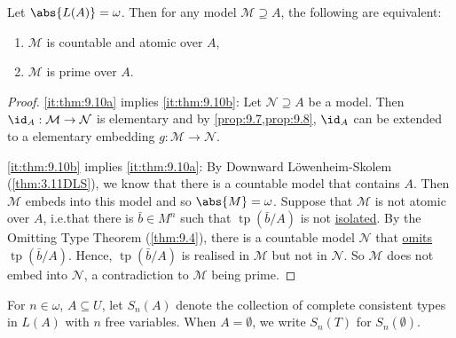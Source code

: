 \documentclass{article}
\DeclareMathOperator{\tp}{tp}
\newcommand{\M}{\mathcal{M}}
\renewcommand{\N}{\mathcal{N}}
\begin{document}
\begin{nthm} \label{thm:9.10}
Let $\abs{L(A)} = \omega$. Then for any model $\M \supseteq A$, the following are equivalent:
\begin{enumerate}[label=(\roman*)]
\item $\M$ is countable and atomic over $A$, \label{it:thm:9.10a}
\item $\M$ is prime over $A$. \label{it:thm:9.10b}
\end{enumerate}
\end{nthm}
\begin{proof}
\ref{it:thm:9.10a} implies \ref{it:thm:9.10b}: Let $\N \supseteq A$ be a model. Then $\id_A : \M \to \N$ is elementary and by \cref{prop:9.7,prop:9.8}, $\id_A$ can be extended to a elementary embedding $g:\M \to \N$.

\ref{it:thm:9.10b} implies \ref{it:thm:9.10a}: By Downward Löwenheim-Skolem (\cref{thm:3.11DLS}), we know that there is a countable model that contains $A$. Then $\M$ embeds into this model and so $\abs{M} = \omega$.
Suppose that $\M$ is not atomic over $A$, i.e.\@ that there is $\bar{b} \in M^n$ such that $\tp(\bar{b}/A)$ is not \hyperlink{def:isolate}{isolated}. By the Omitting Type Theorem (\cref{thm:9.4}), there is a countable model $\N$ that \hyperlink{def:omit}{omits} $\tp(\bar{b}/A)$. Hence, $\tp(\bar{b}/A)$ is realised in $\mathcal{M}$ but not in $\mathcal{N}$. So $\M$ does not embed into $\N$, a contradiction to $\M$ being prime.
\end{proof}

\begin{ndef} \label{def:9.11} 
For $n \in \omega$, $A \subseteq U$, let $S_n(A)$ denote the collection of complete consistent types in $L(A)$ with $n$ free variables. When $A = \emptyset$, we write $S_n(T)$ for $S_n(\emptyset)$.
\end{ndef}
\end{document}
